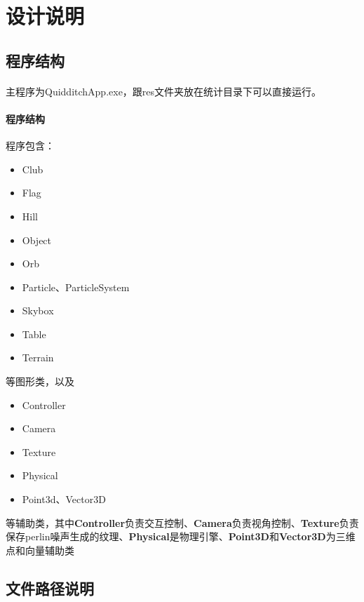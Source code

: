 \documentclass{article}
\begin{document}
    \section{设计说明}
        \subsection{程序结构}
            \paragraph{}主程序为QuidditchApp.exe，跟res文件夹放在统计目录下可以直接运行。
            \paragraph{程序结构}
                程序包含：\\
                \begin{itemize}
                  \item Club
                  \item Flag
                  \item Hill
                  \item Object
                  \item Orb
                  \item Particle、ParticleSystem
                  \item Skybox
                  \item Table
                  \item Terrain
                \end{itemize}
                等图形类，以及
                \begin{itemize}
                  \item Controller
                  \item Camera
                  \item Texture
                  \item Physical
                  \item Point3d、Vector3D
                \end{itemize}
                等辅助类，其中\textbf{Controller}负责交互控制、\textbf{Camera}负责视角控制、\textbf{Texture}负责保存perlin噪声生成的纹理、\textbf{Physical}是物理引擎、\textbf{Point3D}和\textbf{Vector3D}为三维点和向量辅助类
        \subsection{文件路径说明}
\end{document}
